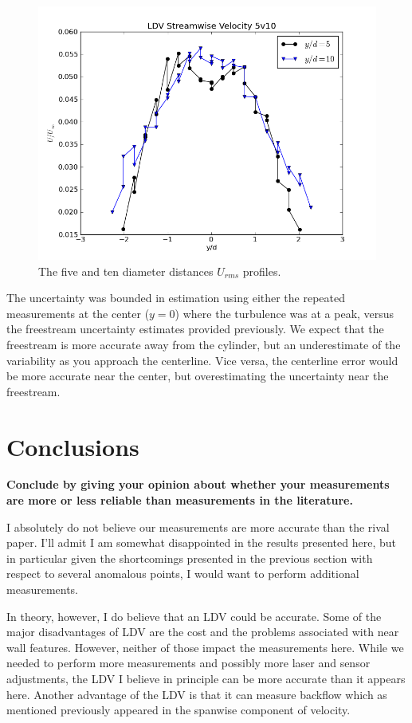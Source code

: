 \documentclass{article}
\begin{document}
\begin{figure}[!htb]
 \begin{center}
  \includegraphics[width = 12 cm]{figs/urms}
  \caption{The five and ten diameter distances $U_{rms}$ profiles. }
  \label{back}
 \end{center}
\end{figure}

The uncertainty was bounded in estimation using either the repeated
measurements at the center ($y=0$) where the turbulence was at a peak,
versus the freestream uncertainty estimates provided previously. We
expect that the freestream is more accurate away from the cylinder, but
an underestimate of the variability as you approach the centerline. Vice
versa, the centerline error would be more accurate near the center, but
overestimating the uncertainty near the freestream. 

\section{Conclusions}

\textbf{Conclude by giving your opinion about whether your measurements
are more or less reliable than measurements in the literature.} 

I absolutely do not believe our measurements are more accurate than the
rival paper. I'll admit I am somewhat disappointed in the results
presented here, but in particular given the shortcomings presented in
the previous section with respect to several anomalous points, I would
want to perform additional measurements. 

In theory, however, I do believe that an LDV could be accurate. Some of
the major disadvantages of LDV are the cost and the problems associated
with near wall features. However, neither of those impact the
measurements here. While we needed to perform more measurements and
possibly more laser and sensor adjustments, the LDV I believe in
principle can be more accurate than it appears here. Another
advantage of the LDV is that it can measure backflow which as mentioned
previously appeared in the spanwise component of velocity. 



%
%
%
\end{document}
